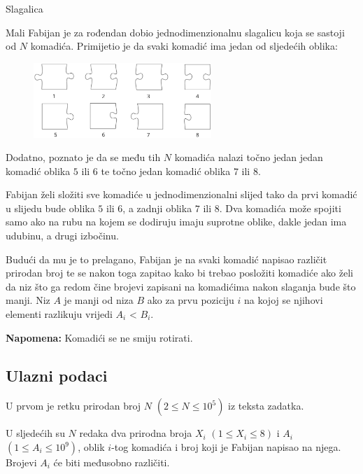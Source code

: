 \begin{statement}[
  problempoints=70,
  timelimit=1 sekunda,
  memorylimit=512 MiB,
]{Slagalica}

Mali Fabijan je za rođendan dobio jednodimenzionalnu slagalicu koja se sastoji
od $N$ komadića. Primijetio je da svaki komadić ima jedan od sljedećih oblika:
\\

\begin{figure}[H]
\centering
\includegraphics[width=0.6\textwidth]{img/puzzledef.png}
\end{figure}

Dodatno, poznato je da se među tih $N$ komadića nalazi točno jedan jedan komadić
oblika $5$ ili $6$ te točno jedan komadić oblika $7$ ili $8$.

Fabijan želi složiti sve komadiće u jednodimenzionalni slijed tako da prvi
komadić u slijedu bude oblika $5$ ili $6$, a zadnji oblika $7$ ili $8$.
Dva komadića može spojiti samo ako na rubu na kojem se dodiruju imaju suprotne
oblike, dakle jedan ima udubinu, a drugi izbočinu.

Budući da mu je to prelagano, Fabijan je na svaki komadić napisao različit
prirodan broj te se nakon toga zapitao kako bi trebao posložiti komadiće ako
želi da niz što ga redom čine brojevi zapisani na komadićima nakon slaganja bude
što manji. Niz $A$ je manji od niza $B$ ako za prvu poziciju $i$ na kojoj se
njihovi elementi razlikuju vrijedi $A_i$ < $B_i$.

\textbf{Napomena:} Komadići se ne smiju rotirati.

\subsection*{Ulazni podaci}
U prvom je retku prirodan broj $N$ $(2 \le N \le 10^5)$ iz teksta zadatka.

U sljedećih su $N$ redaka dva prirodna broja $X_i$ $(1 \le X_i \le 8)$ i $A_i$
$(1 \le A_i \le 10^9)$, oblik $i$-tog komadića i broj koji je Fabijan napisao na
njega. Brojevi $A_i$ će biti međusobno različiti.


\end{statement}
